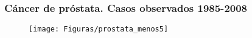 \documentclass{beamer}
\begin{document}

\begin{frame}\frametitle{Cáncer de próstata. Casos observados 1985-2008}
\vspace{-10pt}

\begin{figure}
	\centering
	\texttt{[image: Figuras/prostata\_menos5]}
\end{figure}

\end{frame}


\end{document}
